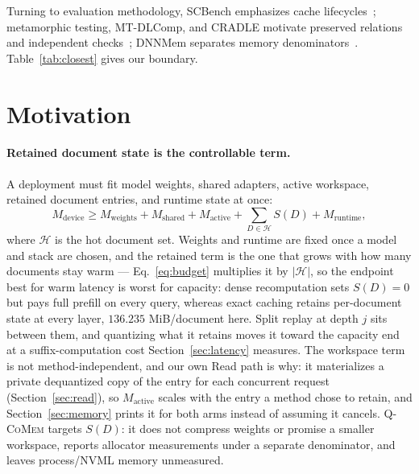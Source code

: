 \documentclass{article}
\newcommand{\qcomem}{\textsc{Q-CoMem}}
\begin{document}
Turning to evaluation methodology, SCBench emphasizes cache
lifecycles~\citep{li2025scbench}; metamorphic testing,
MT-DLComp, and CRADLE motivate preserved relations and independent
checks~\citep{chen2018metamorphic,xiao2022metamorphic,pham2019cradle}; DNNMem
separates memory denominators~\citep{gao2020dnnmem}.
Table~\ref{tab:closest} gives our boundary.

\section{Motivation}
\label{sec:motivation}

\paragraph{Retained document state is the controllable term.}
A deployment must fit model weights, shared adapters, active workspace,
retained document entries, and runtime state at once:
\begin{equation}
 M_{\mathrm{device}} \geq M_{\mathrm{weights}}+M_{\mathrm{shared}}
 +M_{\mathrm{active}}+\sum_{D\in\mathcal{H}}S(D)+M_{\mathrm{runtime}},
 \label{eq:budget}
\end{equation}
where $\mathcal{H}$ is the hot document set. Weights and runtime are fixed once
a model and stack are chosen, and the retained term is the one that grows with
how many documents stay warm --- Eq.~\ref{eq:budget} multiplies it by
$|\mathcal{H}|$, so the endpoint best for warm latency is worst for capacity:
dense recomputation sets $S(D)=0$ but pays full prefill on every query, whereas
exact caching retains per-document state at every layer, $136.235$ MiB/document
here.  Split replay at depth $j$ sits between them, and quantizing what it
retains moves it toward the capacity end at a suffix-computation cost
Section~\ref{sec:latency} measures.  The workspace term is not
method-independent, and our own Read path is why: it materializes a private
dequantized copy of the entry for each concurrent request
(Section~\ref{sec:read}), so $M_{\mathrm{active}}$ scales with the entry a
method chose to retain, and Section~\ref{sec:memory} prints it for both arms
instead of assuming it cancels.  \qcomem{} targets $S(D)$: it does not compress
weights or promise a smaller workspace, reports allocator measurements under a
separate denominator, and leaves process/NVML memory unmeasured.
\end{document}
